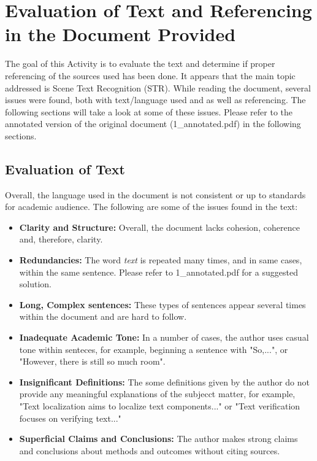 \chapter*{Evaluation of Text and Referencing in the Document Provided}
\label{chap1}

The goal of this Activity is to evaluate the text and determine if proper referencing of the sources used has been done. It appears that the main topic addressed is Scene Text Recognition (STR). While reading the document, several issues were found, both with text/language used and as well as referencing. The following sections will take a look at some of these issues. Please refer to the annotated version of the original document (1\_annotated.pdf) in the following sections.

\newpage

\section*{Evaluation of Text} 
Overall, the language used in the document is not consistent or up to standards for academic audience. The following are some of the issues found in the text:
\begin{itemize}
    \item \textbf{Clarity and Structure:} Overall, the document lacks cohesion, coherence and, therefore, clarity. 
    \item  \textbf{Redundancies:} The word \textit{text} is repeated many times, and in same cases, within the same sentence. Please refer to 1\_annotated.pdf for a suggested solution. 
    \item  \textbf{Long, Complex sentences:} These types of sentences appear several times within the document and are hard to follow. 
    \item  \textbf{Inadequate Academic Tone:} In a number of cases, the author uses casual tone within senteces, for example, beginning a sentence with "So,...", or "However, there is still so much room". 
\item  \textbf{Insignificant Definitions:} The some definitions given by the author
do not provide any meaningful explanations of the subjecct matter, for example, "Text localization aims to localize text components..." or "Text verification focuses on verifying text..."
\item  \textbf{Superficial Claims and Conclusions:} The author makes strong claims and conclusions about methods and outcomes without citing sources.

\end{itemize} 

